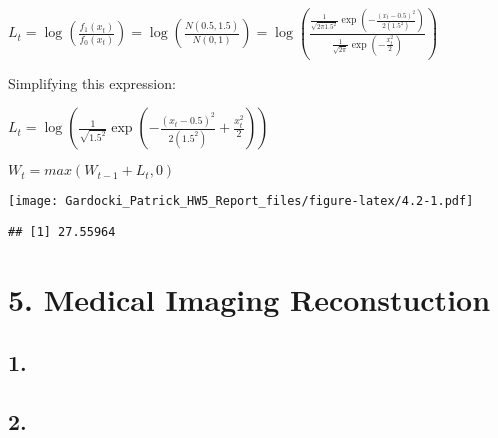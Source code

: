\documentclass[
]{article}
\begin{document}
\(L_t = \log\left(\frac{f_1(x_t)}{f_0(x_t)}\right)= \log\left(\frac{N(0.5, 1.5)}{N(0, 1)}\right) = \log\left(\frac{\frac{1}{\sqrt{2\pi1.5^2}}\exp\left(-\frac{(x_t-0.5)^2}{2(1.5^2)}\right)}{\frac{1}{\sqrt{2\pi}}\exp\left(-\frac{x_t^2}{2}\right)}\right)\)

Simplifying this expression:

\(L_t = \log\left(\frac{1}{\sqrt{1.5^2}}\exp\left(-\frac{(x_t-0.5)^2}{2(1.5^2)}+\frac{x_t^2}{2}\right)\right)\)

\(W_t=max(W_{t-1}+L_t,0)\)

\texttt{[image: Gardocki\_Patrick\_HW5\_Report\_files/figure-latex/4.2-1.pdf]}

\begin{verbatim}
## [1] 27.55964
\end{verbatim}

\hypertarget{medical-imaging-reconstuction}{%
\section{5. Medical Imaging
Reconstuction}\label{medical-imaging-reconstuction}}

\hypertarget{section-8}{%
\subsection{1.}\label{section-8}}

\hypertarget{section-9}{%
\subsection{2.}\label{section-9}}
\end{document}
